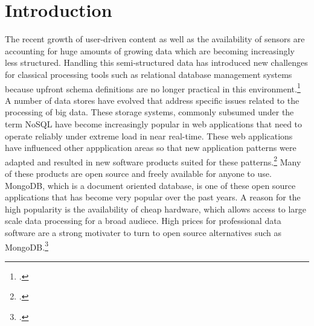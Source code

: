 \newpage

\listoftables
{}
\newpage


\listoffigures
{}
\newpage

\listoflistings
{}
\newpage

\renewcommand{\thepage}{\arabic{page}}

\setcounter{page}{1} 


\section{Introduction}
\label{sec:introduction}

The recent growth of user-driven content as well as the availability of sensors
are accounting for huge amounts of growing data which are becoming increasingly
less structured. Handling this semi-structured data has introduced new
challenges for classical processing tools such as relational database management
systems because upfront schema definitions are no longer practical in this
environment.\footcite[Cf.][XVII]{Tiwari_2011} A number of data stores have
evolved that address specific issues related to the processing of big data.
These storage systems, commonly subsumed under the term NoSQL have become
increasingly popular in web applications that need to operate reliably under
extreme load in near real-time.
These web applications have influenced other appplication areas so that new
application patterns were adapted and resulted in new software products suited
for these patterns.\footcite[Cf.][VII]{Warden_2011} Many of these products are
open source and freely available for anyone to use.
MongoDB, which is a document oriented database, is one of these open source
applications that has become very popular over the past years.
A reason for the high popularity is the availability of cheap hardware, which
allows access to large scale data processing for a broad audiece.
High prices for professional data software are a strong motivater to turn to
open source alternatives such as MongoDB.\footcite[Cf.][VII]{Warden_2011}



